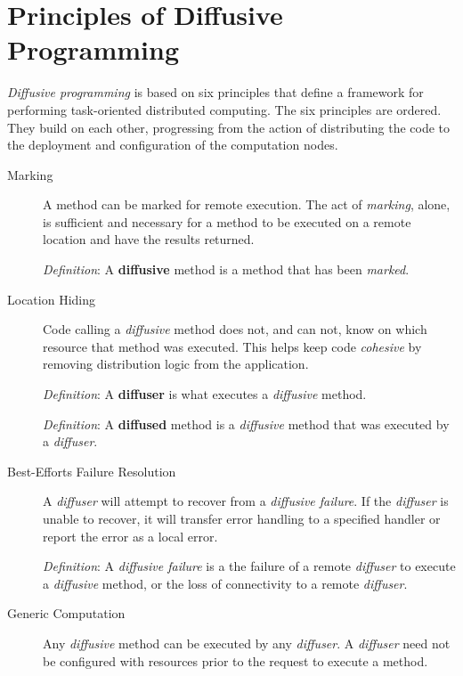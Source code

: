 \documentclass[11pt]{article}
\begin{document}
%
%
\section{Principles of Diffusive Programming\label{sec:principles_of_diffusive_programming}}
\emph{Diffusive programming} is based on six principles that define a framework for performing task-oriented distributed computing. The six principles are ordered. They build on each other, progressing from the action of distributing the code to the deployment and configuration of the computation nodes.

\begin{description}

	\item[Marking] 
	A method can be marked for remote execution. The act of \emph{marking}, alone, is sufficient and necessary for a method to be executed on a remote location and have the results returned.
	
	\emph{Definition}: A \textbf{diffusive} method is a method that has been \emph{marked}.

	\item[Location Hiding]
	Code calling a \emph{diffusive} method does not, and can not, know on which resource that method was executed. This helps keep code \emph{cohesive} by removing distribution logic from the application. 
	
	\emph{Definition}: A \textbf{diffuser} is what executes a \emph{diffusive} method.
	
	\emph{Definition}: A \textbf{diffused} method is a \emph{diffusive} method that was executed by a \emph{diffuser}. 
	
	\item[Best-Efforts Failure Resolution]
	A \emph{diffuser} will attempt to recover from a \emph{diffusive failure}. If the \emph{diffuser} is unable to recover, it will transfer error handling to a specified handler or report the error as a local error.
	
	\emph{Definition}: A \emph{diffusive failure} is a the failure of a remote \emph{diffuser} to execute a \emph{diffusive} method, or the loss of connectivity to a remote \emph{diffuser}.
	
	\item[Generic Computation]
	Any \emph{diffusive} method can be executed by any \emph{diffuser}. A \emph{diffuser} need not be configured with resources prior to the request to execute a method.
	

\end{description}
\end{document}
